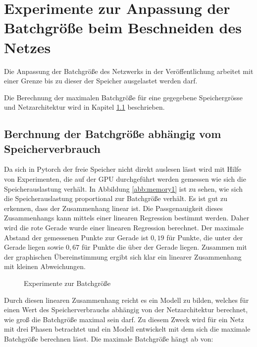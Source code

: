 \section{Experimente zur Anpassung der Batchgröße beim Beschneiden des Netzes}\label{sec:ptnew}
Die Anpassung der Batchgröße des Netzwerks in der Veröffentlichung arbeitet mit einer Grenze bis zu dieser der Speicher ausgelastet werden darf. 

Die Berechnung der maximalen Batchgröße für eine gegegebene Speichergrösse und Netzarchitektur wird in Kapitel \ref{sec:batch} beschrieben.


\subsection{Berchnung der Batchgröße abhängig vom Speicherverbrauch}\label{sec:batch}
Da sich in Pytorch der freie Speicher nicht direkt auslesen lässt wird mit Hilfe von Experimenten, die auf der GPU durchgeführt werden gemessen wie sich die Speicherauslastung verhält. In Abbildung \ref{abb:memory1} ist zu sehen, wie sich die Speicherauslastung proportional zur Batchgröße verhält. Es ist gut zu erkennen, dass der Zusammenhang linear ist. Die Passgenauigkeit dieses Zusammenhangs kann mittels einer linearen Regression bestimmt werden.  Daher wird  die rote Gerade wurde einer linearen Regression berechnet. Der maximale Abstand der gemessenen Punkte zur Gerade ist $0,19$ für Punkte, die unter der Gerade liegen sowie $0,67$ für Punkte die über der Gerade liegen. Zusammen mit der graphischen Übereinstimmung ergibt sich klar ein linearer Zusammenhang mit kleinen Abweichungen.
 \begin{figure}
     \centering
     \caption{Experimente zur Batchgröße}
     \label{abb:memory}
\end{figure}
Durch diesen linearen Zusammenhang reicht es ein Modell zu bilden, welches für einen Wert des Speicherverbrauchs abhängig von der Netzarchitektur berechnet, wie groß die Batchgröße maximal sein darf. Zu diesem Zweck wird für ein Netz mit drei Phasen betrachtet und ein Modell entwickelt mit dem sich die maximale Batchgröße berechnen lässt. Die maximale Batchgröße hängt ab von:
